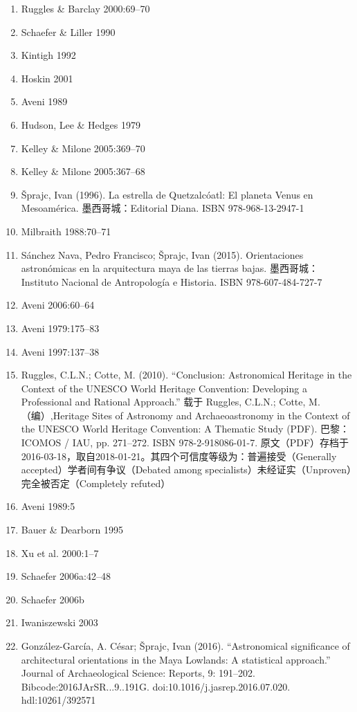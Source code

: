 \begin{enumerate}
    \item Ruggles \& Barclay 2000:69–70
    \item Schaefer \& Liller 1990
    \item Kintigh 1992
    \item Hoskin 2001
    \item Aveni 1989
    \item Hudson, Lee \& Hedges 1979
    \item Kelley \& Milone 2005:369–70
    \item Kelley \& Milone 2005:367–68
    \item Šprajc, Ivan (1996). La estrella de Quetzalcóatl: El planeta Venus en Mesoamérica. 墨西哥城：Editorial Diana. ISBN 978-968-13-2947-1
    \item Milbraith 1988:70–71
    \item Sánchez Nava, Pedro Francisco; Šprajc, Ivan (2015). Orientaciones astronómicas en la arquitectura maya de las tierras bajas. 墨西哥城：Instituto Nacional de Antropología e Historia. ISBN 978-607-484-727-7
    \item Aveni 2006:60–64
    \item Aveni 1979:175–83
    \item Aveni 1997:137–38
    \item Ruggles, C.L.N.; Cotte, M. (2010). “Conclusion: Astronomical Heritage in the Context of the UNESCO World Heritage Convention: Developing a Professional and Rational Approach.” 载于 Ruggles, C.L.N.; Cotte, M.（编）,Heritage Sites of Astronomy and Archaeoastronomy in the Context of the UNESCO World Heritage Convention: A Thematic Study (PDF). 巴黎：ICOMOS / IAU, pp. 271–272. ISBN 978-2-918086-01-7. 原文（PDF）存档于2016-03-18，取自2018-01-21。其四个可信度等级为：普遍接受（Generally accepted）学者间有争议（Debated among specialists）未经证实（Unproven）完全被否定（Completely refuted）
    \item Aveni 1989:5
    \item Bauer \& Dearborn 1995
    \item Xu et al. 2000:1–7
    \item Schaefer 2006a:42–48
    \item Schaefer 2006b
    \item Iwaniszewski 2003
    \item González-García, A. César; Šprajc, Ivan (2016). “Astronomical significance of architectural orientations in the Maya Lowlands: A statistical approach.” Journal of Archaeological Science: Reports, 9: 191–202. Bibcode:2016JArSR...9..191G. doi:10.1016/j.jasrep.2016.07.020. hdl:10261/392571

\end{enumerate}
